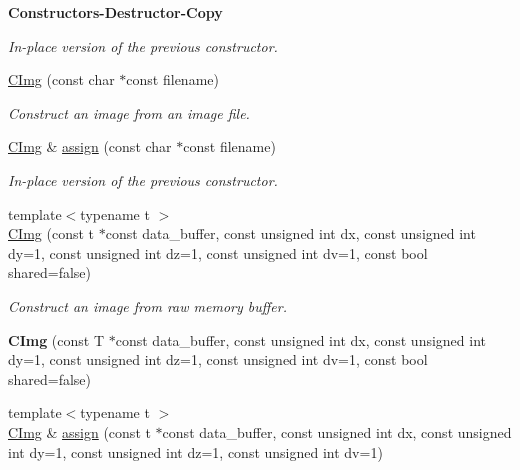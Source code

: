 \begin{Indent}{\bf Constructors-\/\-Destructor-\/\-Copy}
\begin{DoxyCompactItemize}
\begin{DoxyCompactList}\small\item\em In-\/place version of the previous constructor. \end{DoxyCompactList}\item 
\hyperlink{structcimg__library_1_1_c_img_a9a6e32d682055c3e357e8bddbb18916b}{C\-Img} (const char $\ast$const filename)
\begin{DoxyCompactList}\small\item\em Construct an image from an image file. \end{DoxyCompactList}\item 
\hyperlink{structcimg__library_1_1_c_img}{C\-Img} \& \hyperlink{structcimg__library_1_1_c_img_a791ec7a0e62b46d077a0c2fca1cd59f3}{assign} (const char $\ast$const filename)
\begin{DoxyCompactList}\small\item\em In-\/place version of the previous constructor. \end{DoxyCompactList}\item 
{\footnotesize template$<$typename t $>$ }\\\hyperlink{structcimg__library_1_1_c_img_aeec5237cfe208b29daa7731e16b44323}{C\-Img} (const t $\ast$const data\-\_\-buffer, const unsigned int dx, const unsigned int dy=1, const unsigned int dz=1, const unsigned int dv=1, const bool shared=false)
\begin{DoxyCompactList}\small\item\em Construct an image from raw memory buffer. \end{DoxyCompactList}\item 
\hypertarget{structcimg__library_1_1_c_img_a9dadc23916e0d8b3099f9681d9dbbac0}{{\bfseries C\-Img} (const T $\ast$const data\-\_\-buffer, const unsigned int dx, const unsigned int dy=1, const unsigned int dz=1, const unsigned int dv=1, const bool shared=false)}\label{structcimg__library_1_1_c_img_a9dadc23916e0d8b3099f9681d9dbbac0}

\item 
\hypertarget{structcimg__library_1_1_c_img_a7706e62570e521d2246a65e373c6dc05}{{\footnotesize template$<$typename t $>$ }\\\hyperlink{structcimg__library_1_1_c_img}{C\-Img} \& \hyperlink{structcimg__library_1_1_c_img_a7706e62570e521d2246a65e373c6dc05}{assign} (const t $\ast$const data\-\_\-buffer, const unsigned int dx, const unsigned int dy=1, const unsigned int dz=1, const unsigned int dv=1)}\label{structcimg__library_1_1_c_img_a7706e62570e521d2246a65e373c6dc05}


\end{DoxyCompactItemize}
\end{Indent}
